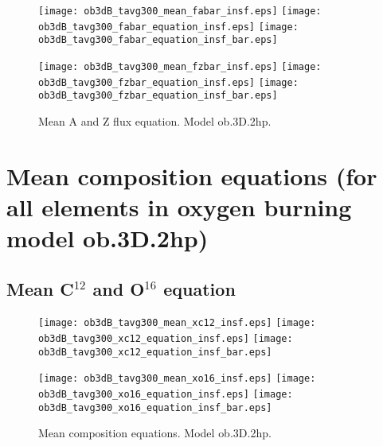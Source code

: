 \documentclass[10pt,paper=a4]{report}
\begin{document}
\begin{figure}[!h]
\centerline{
\texttt{[image: ob3dB\_tavg300\_mean\_fabar\_insf.eps]}
\texttt{[image: ob3dB\_tavg300\_fabar\_equation\_insf.eps]}
\texttt{[image: ob3dB\_tavg300\_fabar\_equation\_insf\_bar.eps]}}

\centerline{
\texttt{[image: ob3dB\_tavg300\_mean\_fzbar\_insf.eps]}
\texttt{[image: ob3dB\_tavg300\_fzbar\_equation\_insf.eps]}
\texttt{[image: ob3dB\_tavg300\_fzbar\_equation\_insf\_bar.eps]}}
\caption{Mean A and Z flux equation. Model {\sf ob.3D.2hp}. \label{fig:fcomp-equation}}
\end{figure}

\clearpage

\section{Mean composition equations (for all elements in oxygen burning model ob.3D.2hp)}





\subsection{Mean C$^{12}$ and O$^{16}$ equation}

\begin{figure}[!h]
\centerline{
\texttt{[image: ob3dB\_tavg300\_mean\_xc12\_insf.eps]}
\texttt{[image: ob3dB\_tavg300\_xc12\_equation\_insf.eps]}
\texttt{[image: ob3dB\_tavg300\_xc12\_equation\_insf\_bar.eps]}}

\centerline{
\texttt{[image: ob3dB\_tavg300\_mean\_xo16\_insf.eps]}
\texttt{[image: ob3dB\_tavg300\_xo16\_equation\_insf.eps]}
\texttt{[image: ob3dB\_tavg300\_xo16\_equation\_insf\_bar.eps]}}
\caption{Mean composition equations. Model {\sf ob.3D.2hp}. \label{fig:xhe4-xc12-equations}}
\end{figure}
\end{document}
